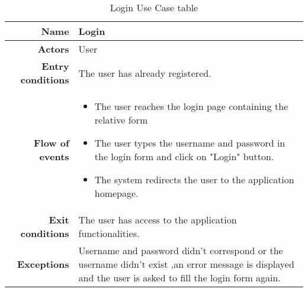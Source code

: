 \begin{table}[htp]

\begin{tabular}{r|p{7cm}}
\bf\large Name&\bf\large Login\\
\hline
\hline
\bf Actors&User\\
\hline
\bf Entry conditions&The user has already registered.\\
\hline
\bf Flow of events&
\begin{itemize}
\item The user reaches the login page containing the relative form
\item The user types the username and password in the login form and click on "Login" button.
\item The system redirects the user to the application homepage.
\end{itemize}
\\
\hline
\bf Exit conditions&The user has access to the application functionalities. \\
\hline
\bf Exceptions&Username and password didn't correspond or the username didn't exist ,an error message is displayed and the user is asked to fill the login form again.\\
\hline

\end{tabular}

\caption{Login Use Case table} \label{tab:login}
\end{table}